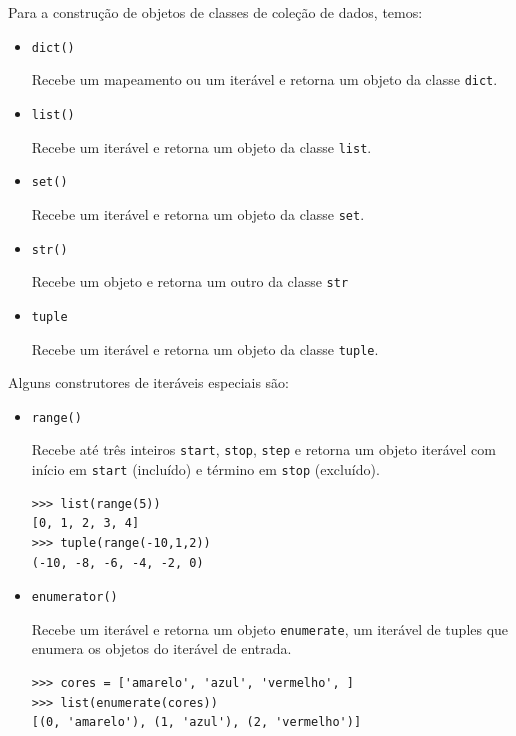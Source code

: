 Para a construção de objetos de classes de coleção de dados, temos:
\begin{itemize}
\item \lstinline+dict()+ 

  Recebe um mapeamento ou um iterável e retorna um objeto da classe \lstinline+dict+.

\item \lstinline+list()+ 

  Recebe um iterável e retorna um objeto da classe \lstinline+list+.

\item \lstinline+set()+ 

  Recebe um iterável e retorna um objeto da classe \lstinline+set+.

\item \lstinline+str()+ 

  Recebe um objeto e retorna um outro da classe \lstinline+str+

\item \lstinline+tuple+ 

  Recebe um iterável e retorna um objeto da classe \lstinline+tuple+.
\end{itemize}

Alguns construtores de iteráveis especiais são:
\begin{itemize}
\item \lstinline+range()+ 

  Recebe até três inteiros \lstinline+start+, \lstinline+stop+, \lstinline+step+ e retorna um objeto iterável com início em \lstinline+start+ (incluído) e término em \lstinline+stop+ (excluído).

\begin{lstlisting}
>>> list(range(5))
[0, 1, 2, 3, 4]
>>> tuple(range(-10,1,2))
(-10, -8, -6, -4, -2, 0)
\end{lstlisting}

\item \lstinline+enumerator()+ 

  Recebe um iterável e retorna um objeto \lstinline+enumerate+, um iterável de tuples que enumera os objetos do iterável de entrada.

\begin{lstlisting}
>>> cores = ['amarelo', 'azul', 'vermelho', ]
>>> list(enumerate(cores))
[(0, 'amarelo'), (1, 'azul'), (2, 'vermelho')]
\end{lstlisting}

\end{itemize}

